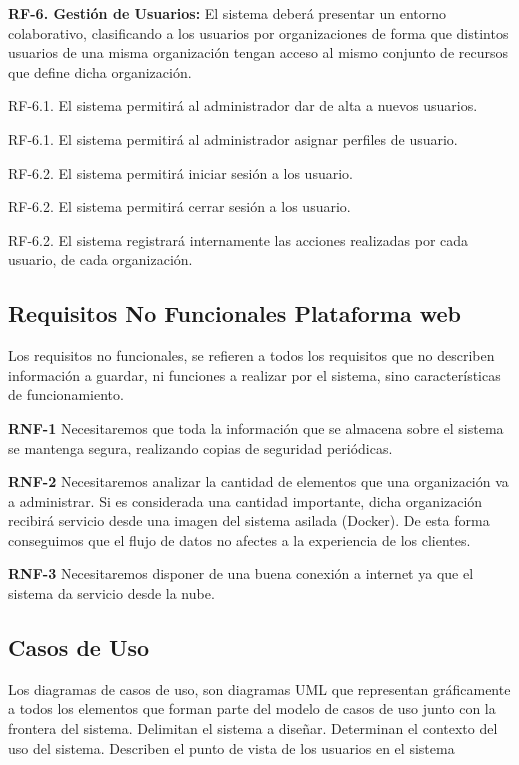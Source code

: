 \documentclass[a4paper,11pt]{book}
\begin{document}
	

\textbf{RF-6. Gestión de Usuarios:} El sistema deberá presentar un entorno colaborativo, clasificando a los usuarios por organizaciones de forma que distintos usuarios de una misma organización tengan acceso al mismo conjunto de recursos que define dicha organización. 


	RF-6.1. El sistema permitirá al administrador dar de alta a nuevos usuarios.
	
	RF-6.1. El sistema permitirá al administrador asignar perfiles de usuario.
	
	RF-6.2. El sistema permitirá iniciar sesión a los usuario.
	
	RF-6.2. El sistema permitirá cerrar sesión a los usuario.
	
	RF-6.2. El sistema registrará internamente las acciones realizadas por cada 	usuario, 	de cada organización. 
	
	

\subsection{Requisitos No Funcionales Plataforma web}
Los requisitos no funcionales, se refieren a todos los requisitos que no describen información a guardar, ni funciones a realizar por el sistema, sino características de funcionamiento.


\textbf{RNF-1} Necesitaremos que toda la información que se almacena sobre el sistema se mantenga segura, realizando copias de seguridad periódicas.


\textbf{RNF-2} Necesitaremos analizar la cantidad de elementos que una organización va a administrar. Si es considerada una cantidad importante, dicha organización recibirá servicio desde una imagen del sistema asilada (Docker). De esta forma conseguimos que el flujo de datos no afectes a la experiencia de los clientes.


\textbf{RNF-3} Necesitaremos disponer de una buena conexión a internet ya que el sistema da servicio desde la nube. 



\subsection{Casos de Uso}

Los diagramas de casos de uso, son diagramas UML que representan gráficamente a todos los elementos que forman parte del modelo de casos de uso junto con la frontera del sistema. Delimitan el sistema a diseñar. Determinan el contexto del uso del sistema. Describen el punto de vista de los usuarios  en el sistema 
\end{document}
